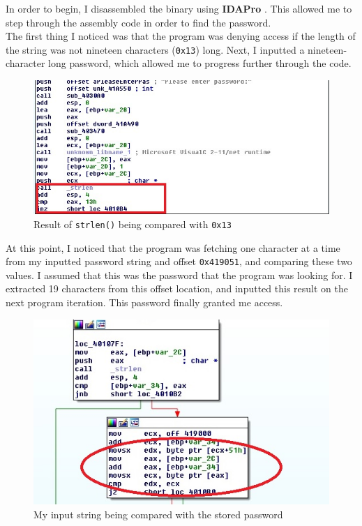 \documentclass[conference]{IEEEtran}
\begin{document}
In order to begin, I disassembled the binary using \textbf{IDAPro} \cite{IDAPro}. This allowed me to step through the assembly code in order to find the password.\\

The first thing I noticed was that the program was denying access if the length of the string was not nineteen characters (\texttt{0x13}) long. Next, I inputted a nineteen-character long password, which allowed me to progress further through the code. 

\begin{figure}[h]
\includegraphics[width=\columnwidth]{image1.jpg}
\caption{Result of \texttt{strlen()} being compared with \texttt{0x13}}
\centering
\end{figure}\mbox{}

At this point, I noticed that the program was fetching one character at a time from my inputted password string and offset \texttt{0x419051}, and comparing these two values. I assumed that this was the password that the program was looking for. I extracted 19 characters from this offset location, and inputted this result on the next program iteration. This password finally granted me access.\\

\begin{figure}[!h]
\includegraphics[width=\columnwidth]{image2.jpg}
\caption{My input string being compared with the stored password}
\centering
\end{figure}\mbox{}
\end{document}
